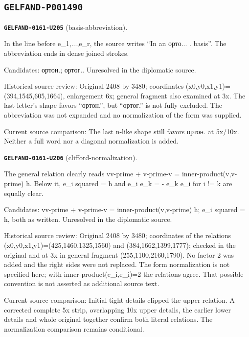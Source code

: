 \subsection*{\texttt{GELFAND-P001490}}
\par\noindent\leavevmode{}\label{GELFAND-0161-U205}\label{GELFAND-P001490:basis-abbreviation}\textbf{\texttt{GELFAND-0161-U205}} (basis-abbreviation).\nopagebreak[4]\par
In the line before e\_1,...,e\_r, the source writes “In an орто... . basis”. The abbreviation ends in dense joined strokes.\par
Candidates: ортон.; ортог.. Unresolved in the diplomatic source.\par
Historical source review: Original 2408 by 3480; coordinates (x0,y0,x1,y1)=(394,1545,605,1664), enlargement 6x; general fragment also examined at 3x. The last letter’s shape favors “ортон.”, but “ортог.” is not fully excluded. The abbreviation was not expanded and no normalization of the form was supplied.\par
Current source comparison: The last n-like shape still favors ортон. at 5x/10x. Neither a full word nor a diagonal normalization is added.\par\medskip
\par\noindent\leavevmode{}\label{GELFAND-0161-U206}\label{GELFAND-P001490:clifford-normalization}\textbf{\texttt{GELFAND-0161-U206}} (clifford-normalization).\nopagebreak[4]\par
The general relation clearly reads vv-prime + v-prime-v = inner-product(v,v-prime) h. Below it, e\_i squared = h and e\_i e\_k = - e\_k e\_i for i != k are equally clear.\par
Candidates: vv-prime + v-prime-v = inner-product(v,v-prime) h; e\_i squared = h, both as written. Unresolved in the diplomatic source.\par
Historical source review: Original 2408 by 3480; coordinates of the relations (x0,y0,x1,y1)=(425,1460,1325,1560) and (384,1662,1399,1777); checked in the original and at 3x in general fragment (255,1100,2160,1790). No factor 2 was added and the right sides were not replaced. The form normalization is not specified here; with inner-product(e\_i,e\_i)=2 the relations agree. That possible convention is not asserted as additional source text.\par
Current source comparison: Initial tight details clipped the upper relation. A corrected complete 5x strip, overlapping 10x upper details, the earlier lower details and whole original together confirm both literal relations. The normalization comparison remains conditional.\par\medskip

